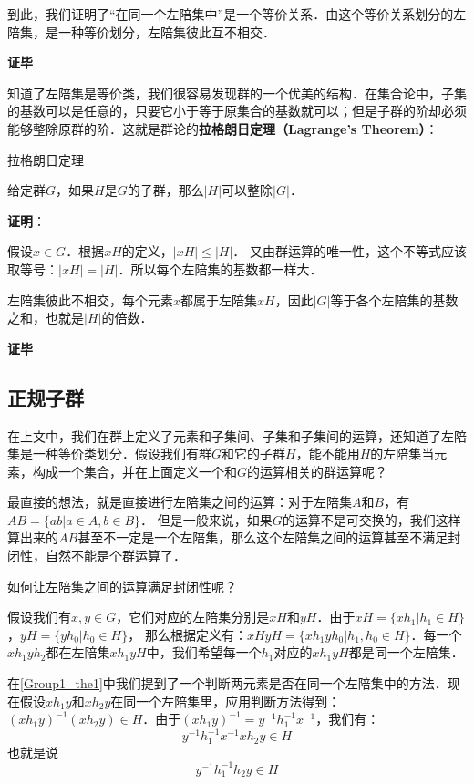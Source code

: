 到此，我们证明了“在同一个左陪集中”是一个等价关系．由这个等价关系划分的左陪集，是一种等价划分，左陪集彼此互不相交．

\textbf{证毕}

知道了左陪集是等价类，我们很容易发现群的一个优美的结构．在集合论中，子集的基数可以是任意的，只要它小于等于原集合的基数就可以；但是子群的阶却必须能够整除原群的阶．这就是群论的\textbf{拉格朗日定理（Lagrange's Theorem）}：

\begin{theorem}{拉格朗日定理}\label{Group1_the2}

给定群$G$，如果$H$是$G$的子群，那么$|H|$可以整除$|G|$．

\end{theorem}

\textbf{证明}：

假设$x\in G$．根据$xH$的定义，$|xH|\leq|H|$． 又由群运算的唯一性，这个不等式应该取等号：$|xH|=|H|$．所以每个左陪集的基数都一样大．

左陪集彼此不相交，每个元素$x$都属于左陪集$xH$，因此$|G|$等于各个左陪集的基数之和，也就是$|H|$的倍数．

\textbf{证毕}

\subsection{正规子群}

在上文中，我们在群上定义了元素和子集间、子集和子集间的运算，还知道了左陪集是一种等价类划分．假设我们有群$G$和它的子群$H$，能不能用$H$的左陪集当元素，构成一个集合，并在上面定义一个和$G$的运算相关的群运算呢？

最直接的想法，就是直接进行左陪集之间的运算：对于左陪集$A$和$B$，有$AB=\{ab|a\in A, b\in B\}$． 但是一般来说，如果$G$的运算不是可交换的，我们这样算出来的$AB$甚至不一定是一个左陪集，那么这个左陪集之间的运算甚至不满足封闭性，自然不能是个群运算了．

如何让左陪集之间的运算满足封闭性呢？

假设我们有$x, y\in G$，它们对应的左陪集分别是$xH$和$yH$．由于$xH=\{xh_1|h_1\in H\}$，$yH=\{yh_0|h_0\in H\}$， 那么根据定义有：$xHyH=\{xh_1yh_0|h_1, h_0\in H\}$．每一个$xh_1yh_2$都在左陪集$xh_1yH$中，我们希望每一个$h_1$对应的$xh_1yH$都是同一个左陪集．

在\autoref{Group1_the1}中我们提到了一个判断两元素是否在同一个左陪集中的方法．现在假设$xh_1y$和$xh_2y$在同一个左陪集里，应用判断方法得到：$(xh_1y)^{-1}(xh_2y)\in H$．由于$(xh_1y)^{-1}=y^{-1}h_1^{-1}x^{-1}$，我们有：$$y^{-1}h_1^{-1}x^{-1}xh_2y\in H$$
也就是说$$y^{-1}h^{-1}_1h_2y\in H$$

